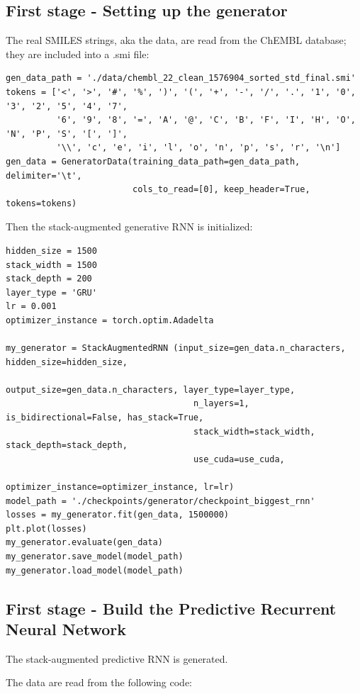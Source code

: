 \documentclass[a4paper]{article}
\begin{document}
\subsection{First stage - Setting up the generator}\label{sec:First stage - Setting up the generator}

The real SMILES strings, aka the data, are read from the ChEMBL database; they are included into a .smi file:

\begin{lstlisting}
gen_data_path = './data/chembl_22_clean_1576904_sorted_std_final.smi'
tokens = ['<', '>', '#', '%', ')', '(', '+', '-', '/', '.', '1', '0', '3', '2', '5', '4', '7',
          '6', '9', '8', '=', 'A', '@', 'C', 'B', 'F', 'I', 'H', 'O', 'N', 'P', 'S', '[', ']',
          '\\', 'c', 'e', 'i', 'l', 'o', 'n', 'p', 's', 'r', '\n']
gen_data = GeneratorData(training_data_path=gen_data_path, delimiter='\t', 
                         cols_to_read=[0], keep_header=True, tokens=tokens)
\end{lstlisting}

Then the stack-augmented generative RNN is initialized:

\begin{lstlisting}
hidden_size = 1500
stack_width = 1500
stack_depth = 200
layer_type = 'GRU'
lr = 0.001
optimizer_instance = torch.optim.Adadelta

my_generator = StackAugmentedRNN (input_size=gen_data.n_characters, hidden_size=hidden_size,
									 output_size=gen_data.n_characters, layer_type=layer_type,
									 n_layers=1, is_bidirectional=False, has_stack=True,
									 stack_width=stack_width, stack_depth=stack_depth, 
									 use_cuda=use_cuda, 
									 optimizer_instance=optimizer_instance, lr=lr)
model_path = './checkpoints/generator/checkpoint_biggest_rnn'
losses = my_generator.fit(gen_data, 1500000)
plt.plot(losses)
my_generator.evaluate(gen_data)
my_generator.save_model(model_path)
my_generator.load_model(model_path)
\end{lstlisting}

\subsection{First stage - Build the Predictive Recurrent Neural Network}\label{sec:First stage - Build the Predictive Recurrent Neural Network}

The stack-augmented predictive RNN is generated. 

The data are read from the following code:
\end{document}
